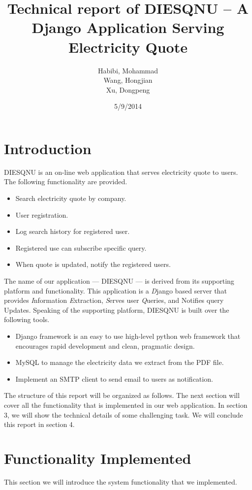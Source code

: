 \documentclass{article}
\title{Technical report of DIESQNU -- A Django Application Serving Electricity Quote\\
\rightline{\small --- IST 510 Final Project Report}}
\author{Habibi, Mohammad\\
Wang, Hongjian\\
Xu, Dongpeng
}
\date{5/9/2014}
\begin{document}
\maketitle


\tableofcontents


\section{Introduction}

DIESQNU is an on-line web application that serves electricity quote to users. The following functionality are provided.
\begin{itemize}
\item Search electricity quote by company.
\item User registration.
\item Log search history for registered user.
\item Registered use can subscribe specific query.
\item When quote is updated, notify the registered users.
\end{itemize}
The name of our application --- DIESQNU --- is derived from its supporting platform and functionality. This application is a \emph{D}jango based server that provides \emph{I}nformation \emph{E}xtraction, \emph{S}erves user \emph{Q}ueries, and Notifies query Updates. Speaking of the supporting platform, DIESQNU is built over the following tools.
\begin{itemize}
\item Django framework is an easy to use high-level python web framework that encourages rapid development and clean, pragmatic design.
\item MySQL to manage the electricity data we extract from the PDF file.
\item Implement an SMTP client to send email to users as notification.
\end{itemize}


The structure of this report will be organized as follows. The next section will cover all the functionality that is implemented in our web application. In section 3, we will show the technical details of some challenging task. We will conclude this report in section 4.




\section{Functionality Implemented}
This section we will introduce the system functionality that we implemented.
\end{document}
